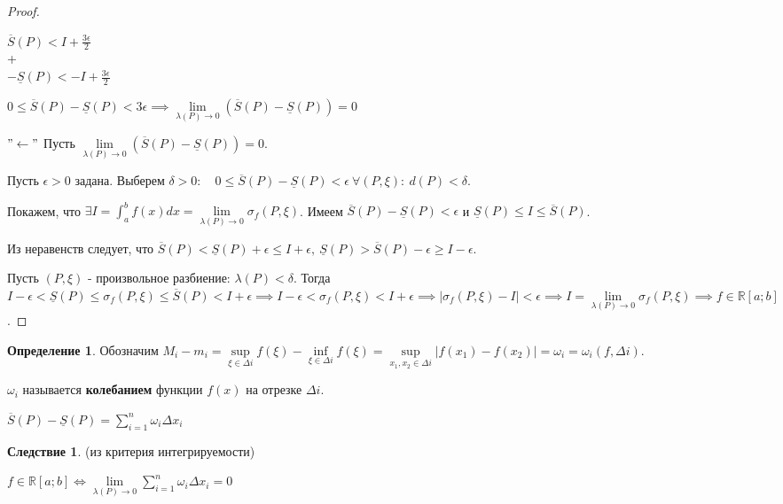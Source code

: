 \documentclass{report}
\theoremstyle{definition}
\newtheorem{definition}{Определение}[section]
\newtheorem*{effect}{Следствие}
\begin{document}
\begin{proof}
  \begin{center}
    $\overline{S}(P) < I + \frac{3\epsilon}{2}$ \\
    +\\
    $-\underline{S}(P) < -I + \frac{3\epsilon}{2}$
  \end{center}


  $0 \leqslant \overline{S}(P) - \underline{S}(P) < 3\epsilon \implies \underset{\lambda(P)\rightarrow0}{\lim}
    (\overline{S}(P) - \underline{S}(P)) = 0$

  $"\leftarrow"$ Пусть $\underset{\lambda(P)\rightarrow0}{\lim}(\overline{S}(P) - \underline{S}(P)) = 0$.

  Пусть $\epsilon > 0$ задана. Выберем $\delta > 0: \quad 0\leqslant\overline{S}(P) - \underline{S}(P) < \epsilon \
    \forall (P,\xi) : \ d(P) < \delta$.

  Покажем, что $\exists I = \int_{a}^{b} f(x)dx = \underset{\lambda(P)\rightarrow0}{\lim}\sigma_{f}(P,\xi)$.
  Имеем $\overline{S}(P) - \underline{S}(P) < \epsilon$ и $\underline{S}(P) \leqslant I \leqslant \overline{S}(P)$.

  Из неравенств следует, что $\overline{S}(P) < \underline{S}(P) + \epsilon \leqslant I + \epsilon, \
    \underline{S}(P) > \overline{S}(P) - \epsilon \geqslant I - \epsilon$.

  Пусть $(P,\xi)$ - произвольное разбиение: $\lambda(P) < \delta$. Тогда $I - \epsilon < \underline{S}(P)
    \leqslant \sigma_{f}(P,\xi) \leqslant \overline{S}(P) < I + \epsilon \implies I - \epsilon <
    \sigma_{f}(P,\xi) < I + \epsilon \implies | \sigma_{f}(P,\xi) - I | < \epsilon \implies I = \underset
    {\lambda(P)\rightarrow0}{\lim}\sigma_{f}(P,\xi) \implies f\in\mathbb{R} [a;b]$.
\end{proof}

\begin{definition}
  Обозначим $M_{i} - m_{i} = \underset{\xi \in \Delta i}{\sup}f(\xi) - \underset{\xi\in\Delta i}{\inf}f(\xi)
    = \underset{x_{1},x_{2}\in\Delta i}{\sup}| f(x_{1}) - f(x_{2}) | = \omega_{i} = \omega_{i}(f,\Delta i)$.

  $\omega_{i}$ называется \textbf{колебанием} функции $f(x)$ на отрезке $\Delta i$.

  $\overline{S}(P) - \underline{S}(P) = \sum_{i = 1}^{n}\omega_{i}\Delta x_{i}$
\end{definition}

\begin{effect}
  (из критерия интегрируемости)

  $f\in\mathbb{R}[a;b] \iff \underset{\lambda(P)\rightarrow0}{\lim} \sum_{i=1}^{n}\omega_{i}\Delta x_{i} = 0$
\end{effect}
\end{document}
